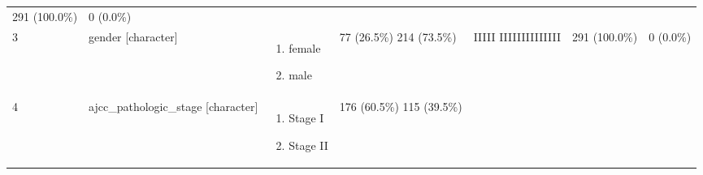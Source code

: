 \documentclass[
]{article}
\providecommand{\tightlist}{%
  \setlength{\itemsep}{0pt}\setlength{\parskip}{0pt}}
\begin{document}
\begin{longtable}[]{@{}lllllll@{}}
\begin{minipage}[t]{0.08\columnwidth}
291
(100.0\%)\strut
\end{minipage} & \begin{minipage}[t]{0.08\columnwidth}\raggedright
0
(0.0\%)\strut
\end{minipage}\tabularnewline
\begin{minipage}[t]{0.03\columnwidth}\raggedright
3\strut
\end{minipage} & \begin{minipage}[t]{0.16\columnwidth}\raggedright
gender
{[}character{]}\strut
\end{minipage} & \begin{minipage}[t]{0.16\columnwidth}\raggedright
\begin{enumerate}
\def\labelenumi{\arabic{enumi}.}
\tightlist
\item
  female
\item
  male
\end{enumerate}\strut
\end{minipage} & \begin{minipage}[t]{0.15\columnwidth}\raggedright
77 (26.5\%)
214 (73.5\%)\strut
\end{minipage} & \begin{minipage}[t]{0.15\columnwidth}\raggedright
IIIII
IIIIIIIIIIIIII\strut
\end{minipage} & \begin{minipage}[t]{0.08\columnwidth}\raggedright
291
(100.0\%)\strut
\end{minipage} & \begin{minipage}[t]{0.08\columnwidth}\raggedright
0
(0.0\%)\strut
\end{minipage}\tabularnewline
\begin{minipage}[t]{0.03\columnwidth}\raggedright
4\strut
\end{minipage} & \begin{minipage}[t]{0.16\columnwidth}\raggedright
ajcc\_pathologic\_stage
{[}character{]}\strut
\end{minipage} & \begin{minipage}[t]{0.16\columnwidth}\raggedright
\begin{enumerate}
\def\labelenumi{\arabic{enumi}.}
\tightlist
\item
  Stage I
\item
  Stage II
\end{enumerate}\strut
\end{minipage} & \begin{minipage}[t]{0.15\columnwidth}\raggedright
176 (60.5\%)
115 (39.5\%)\strut
\end{minipage} & \begin{minipage}[t]{0.15\columnwidth}\raggedright

\end{minipage}
\end{longtable}
\end{document}
